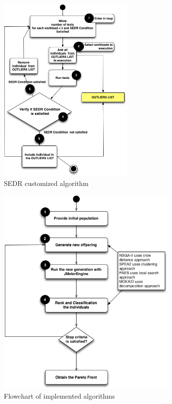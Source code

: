 \documentclass[espaco=umemeio,chapter=TITLE,twoside,openright]{abnt}
\begin{document}
\begin{figure}[!h]
\centering
\includegraphics[width=0.6\textwidth]{./images/suspectlist.png}
\caption{SEDR customized algorithm}
\label{fig:sedrcustomized}
\end{figure}


\begin{figure}[!h]

\centering
\includegraphics[width=0.8\textwidth]{./images/step3.png}
\caption{Flowchart of implemented algorithms}
\label{fig:flowchart}
\end{figure}
\end{document}
